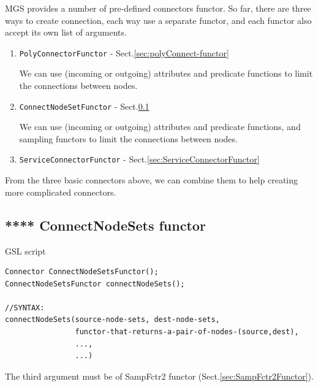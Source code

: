MGS provides a number of pre-defined connectors functor. So far, there are three
ways to create connection, each way use a separate functor, and each functor
also accept its own list of arguments.

\begin{enumerate}
  \item  \verb!PolyConnectorFunctor! - Sect.\ref{sec:polyConnect-functor}

We can use (incoming or outgoing) attributes and predicate functions 
to limit the connections between nodes.


  \item \verb!ConnectNodeSetFunctor! - Sect.\ref{sec:connectNodeSets}
 
We can use (incoming or outgoing) attributes and predicate functions, and
sampling functors to limit the connections between nodes.
  
  \item \verb!ServiceConnectorFunctor! - Sect.\ref{sec:ServiceConnectorFunctor}


\end{enumerate}

From the three basic connectors above, we can combine them to help creating more
complicated connectors.



\subsection{**** ConnectNodeSets functor}
\label{sec:connectNodeSets}

GSL script
\begin{verbatim}
Connector ConnectNodeSetsFunctor();
ConnectNodeSetsFunctor connectNodeSets();

//SYNTAX:
connectNodeSets(source-node-sets, dest-node-sets, 
                functor-that-returns-a-pair-of-nodes-(source,dest),
                ...,
                ...)
\end{verbatim}
The third argument must be of SampFctr2 functor
(Sect.\ref{sec:SampFctr2Functor}).

